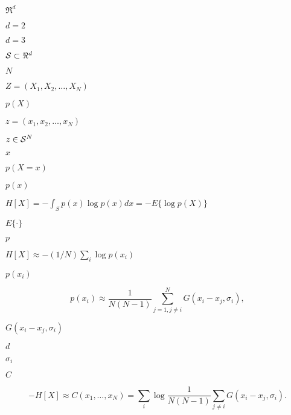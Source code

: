 \documentclass{article}
\begin{document}
$\Re^d$
\pagebreak

$d=2$
\pagebreak

$d=3$
\pagebreak

${\cal S} \subset \Re^d$
\pagebreak

$N$
\pagebreak

$Z = (X_1, X_2, \ldots, X_N)$
\pagebreak

$p(X)$
\pagebreak

$z = (x_1, x_2,\ldots, x_N)$
\pagebreak

$z \in {\cal S}^N$
\pagebreak

$x$
\pagebreak

$p(X = x)$
\pagebreak

$p(x)$
\pagebreak

$H[X] = -\int_S p(x) \log p(x) dx = -E\{\log p(X)\}$
\pagebreak

$E\{ \cdot \}$
\pagebreak

$p$
\pagebreak

$H[X] \approx - (1/N)\sum_{i} \log p(x_i)$
\pagebreak

$p(x_i)$
\pagebreak

\[ p(x_i) \approx \frac{1}{N(N-1)} \sum^N_{j=1, j \neq i} G(x_i - x_j, \sigma_i), \]
\pagebreak

$G(x_i - x_j, \sigma_i)$
\pagebreak

$d$
\pagebreak

$\sigma_i$
\pagebreak

$C$
\pagebreak

\[ -H[X] \approx C(x_1, \dots, x_N) = \sum_{i} \log \frac{1}{N(N-1)} \sum_{j \neq i} G(x_i - x_j, \sigma_i). \]
\pagebreak
\end{document}
